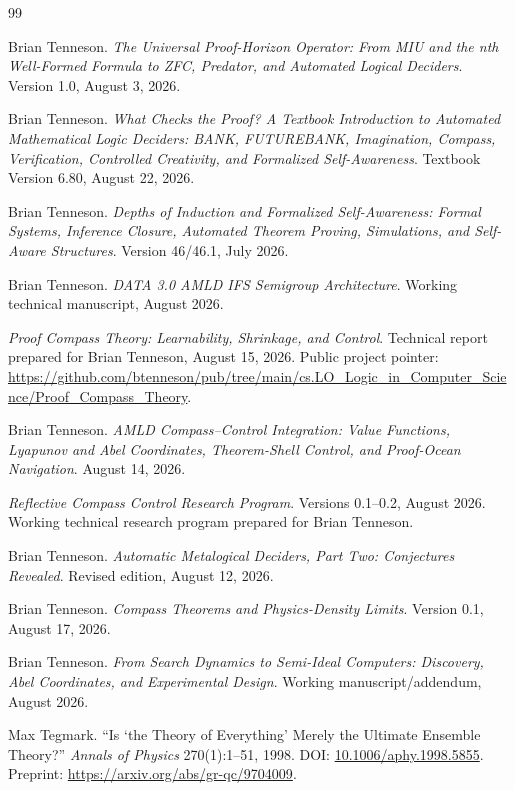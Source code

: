 \documentclass[11pt]{article}
\theoremstyle{definition}
\theoremstyle{remark}
\begin{document}
\begin{thebibliography}{99}

Brian Tenneson.
\emph{The Universal Proof-Horizon Operator: From MIU and the nth Well-Formed Formula to ZFC, Predator, and Automated Logical Deciders}.
Version 1.0, August 3, 2026.

Brian Tenneson.
\emph{What Checks the Proof? A Textbook Introduction to Automated Mathematical Logic Deciders: BANK, FUTUREBANK, Imagination, Compass, Verification, Controlled Creativity, and Formalized Self-Awareness}.
Textbook Version 6.80, August 22, 2026.

Brian Tenneson.
\emph{Depths of Induction and Formalized Self-Awareness: Formal Systems, Inference Closure, Automated Theorem Proving, Simulations, and Self-Aware Structures}.
Version 46/46.1, July 2026.

Brian Tenneson.
\emph{DATA 3.0 AMLD IFS Semigroup Architecture}.
Working technical manuscript, August 2026.

\emph{Proof Compass Theory: Learnability, Shrinkage, and Control}.
Technical report prepared for Brian Tenneson, August 15, 2026.
Public project pointer: \url{https://github.com/btenneson/pub/tree/main/cs.LO_Logic_in_Computer_Science/Proof_Compass_Theory}.

Brian Tenneson.
\emph{AMLD Compass--Control Integration: Value Functions, Lyapunov and Abel Coordinates, Theorem-Shell Control, and Proof-Ocean Navigation}.
August 14, 2026.

\emph{Reflective Compass Control Research Program}.
Versions 0.1--0.2, August 2026. Working technical research program prepared for Brian Tenneson.

Brian Tenneson.
\emph{Automatic Metalogical Deciders, Part Two: Conjectures Revealed}.
Revised edition, August 12, 2026.

Brian Tenneson.
\emph{Compass Theorems and Physics-Density Limits}.
Version 0.1, August 17, 2026.

Brian Tenneson.
\emph{From Search Dynamics to Semi-Ideal Computers: Discovery, Abel Coordinates, and Experimental Design}.
Working manuscript/addendum, August 2026.

Max Tegmark.
``Is `the Theory of Everything' Merely the Ultimate Ensemble Theory?''
\emph{Annals of Physics} 270(1):1--51, 1998.
DOI: \href{https://doi.org/10.1006/aphy.1998.5855}{10.1006/aphy.1998.5855}.
Preprint: \url{https://arxiv.org/abs/gr-qc/9704009}.


\end{thebibliography}
\end{document}

